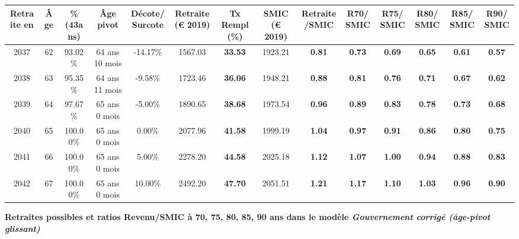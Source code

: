 \begin{adjustbox}{max width=\textwidth} 
\begin{tabular}[htb]{|c|c||c|c|c||c|c||c|c||c|c|c|c|c|} 
\hline 
 Retraite en &  Âge &  \%(43ans) &  Âge pivot &  Décote/Surcote &  Retraite (\euro{} 2019) &  Tx Rempl(\%) &  SMIC (\euro{} 2019) &  Retraite/SMIC &  R70/SMIC &  R75/SMIC &  R80/SMIC &  R85/SMIC &  R90/SMIC \\ 
\hline \hline 
 2037 &  62 &  93.02\% &  64 ans 10 mois &  -14.17\% &  1567.03 &  {\bf 33.53} &  1923.21 &  {\bf {\color{red} 0.81}} &  {\bf {\color{red} 0.73}} &  {\bf {\color{red} 0.69}} &  {\bf {\color{red} 0.65}} &  {\bf {\color{red} 0.61}} &  {\bf {\color{red} 0.57}} \\ 
\hline 
 2038 &  63 &  95.35\% &  64 ans 11 mois &  -9.58\% &  1723.46 &  {\bf 36.06} &  1948.21 &  {\bf {\color{red} 0.88}} &  {\bf {\color{red} 0.81}} &  {\bf {\color{red} 0.76}} &  {\bf {\color{red} 0.71}} &  {\bf {\color{red} 0.67}} &  {\bf {\color{red} 0.62}} \\ 
\hline 
 2039 &  64 &  97.67\% &  65 ans 0 mois &  -5.00\% &  1890.65 &  {\bf 38.68} &  1973.54 &  {\bf {\color{red} 0.96}} &  {\bf {\color{red} 0.89}} &  {\bf {\color{red} 0.83}} &  {\bf {\color{red} 0.78}} &  {\bf {\color{red} 0.73}} &  {\bf {\color{red} 0.68}} \\ 
\hline 
 2040 &  65 &  100.00\% &  65 ans 0 mois &  0.00\% &  2077.96 &  {\bf 41.58} &  1999.19 &  {\bf 1.04} &  {\bf {\color{red} 0.97}} &  {\bf {\color{red} 0.91}} &  {\bf {\color{red} 0.86}} &  {\bf {\color{red} 0.80}} &  {\bf {\color{red} 0.75}} \\ 
\hline 
 2041 &  66 &  100.00\% &  65 ans 0 mois &  5.00\% &  2278.20 &  {\bf 44.58} &  2025.18 &  {\bf 1.12} &  {\bf 1.07} &  {\bf 1.00} &  {\bf {\color{red} 0.94}} &  {\bf {\color{red} 0.88}} &  {\bf {\color{red} 0.83}} \\ 
\hline 
 2042 &  67 &  100.00\% &  65 ans 0 mois &  10.00\% &  2492.20 &  {\bf 47.70} &  2051.51 &  {\bf 1.21} &  {\bf 1.17} &  {\bf 1.10} &  {\bf 1.03} &  {\bf {\color{red} 0.96}} &  {\bf {\color{red} 0.90}} \\ 
\hline 
\hline 
\end{tabular} 
\end{adjustbox} 
 
 \vspace{0.1cm} 
{\bf \noindent Retraites possibles et ratios Revenu/SMIC à 70, 75, 80, 85, 90 ans dans le modèle \emph{Gouvernement corrigé (âge-pivot glissant)}}  
 
